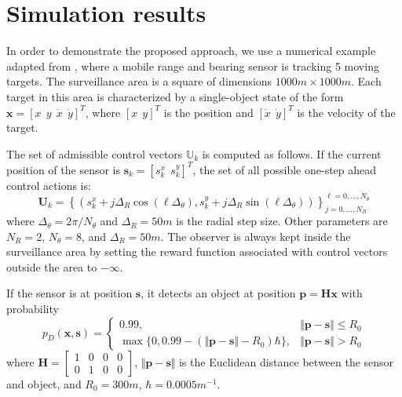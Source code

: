 \documentclass[twocolumn]{autart}
\begin{document}
\section{Simulation results}

In order to demonstrate the proposed approach, we use a numerical example
adapted from \cite{RVC11}, where a mobile range and bearing sensor is
tracking 5 moving targets. The surveillance area is a square of dimensions $1000m\times 1000m$. Each target in this area is characterized by a
single-object state of the form $\mathbf{x}=[x\;\,y\;\,\dot{x}\;\,\dot{y}]^{T}$, where $[x\;\,y]^{T}$ is the position and $[\dot{x}\;\,\dot{y}]^{T}$ is the velocity of the target.

The set of admissible control vectors $\mathbb{U}_{k}$ is computed as follows. If
the current position of the sensor is $\mathbf{s}_{k}=[s^x_k\;\,s^y_k]^{T}$, the set of all
possible one-step ahead control actions is:
\begin{equation*}
\mathbf{U}_{k}=\left\{ (s^x_{k}+j\Delta _{R}\cos (\ell \Delta _{\theta
}),s^y_{k}+j\Delta _{R}\sin (\ell \Delta _{\theta }))\right\} _{j=0,\ldots
,N_{R}}^{\ell =0,\ldots ,N_{\theta }}
\end{equation*}where $\Delta _{\theta }=2\pi /N_{\theta }$ and $\Delta _{R}=50m$ is the
radial step size. Other parameters are $N_{R}=2$, $N_{\theta }=8$, and $\Delta _{R}=50m$. The observer is
always kept inside the surveillance area by setting the reward function
associated with control vectors outside the area to $-\infty $.

If the sensor is at position $\mathbf{s}$, it detects an object at position $\mathbf{p}=\mathbf{H}\mathbf{x}$ with probability
\begin{equation}
p_{D}(\mathbf{x},\mathbf{s})=\begin{cases}
0.99, & \Vert \mathbf{p}-\mathbf{s}\Vert \leq R_{0} \\
\max \{0,0.99-(\Vert \mathbf{p}-\mathbf{s}\Vert -R_{0})\hbar \}, & \Vert
\mathbf{p}-\mathbf{s}\Vert >R_{0}\end{cases}\end{equation}where $\mathbf{H}=\begin{bmatrix}1 &0 &0 &0\\0 &1 &0 &0\end{bmatrix}$, $\Vert \mathbf{p}-\mathbf{s}\Vert $ is the Euclidean distance between the sensor and object, and $R_{0}=300m$, $\hbar =0.0005m^{-1}$.
\end{document}
